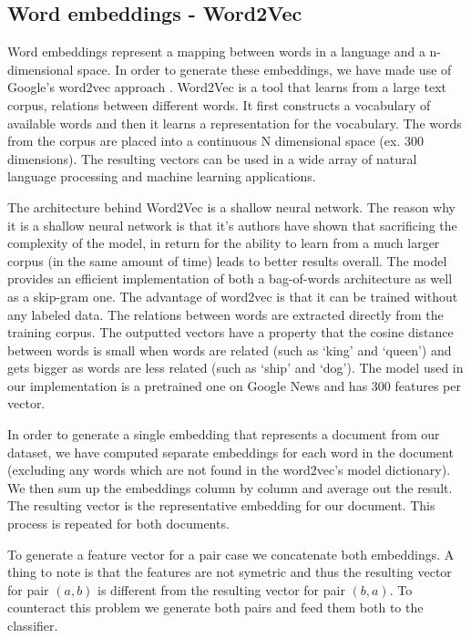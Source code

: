 \subsection{Word embeddings - Word2Vec}
\label{sub-sec:word-embeddings}
Word embeddings represent a mapping between words in a language and a n-dimensional
space. In order to generate these embeddings, we have made use of Google's word2vec
approach \cite{mikolov2013distributed}. Word2Vec is a tool that learns from a large
text corpus, relations between different words. It first constructs a vocabulary
of available words and then it learns a representation for the vocabulary.
The words from the corpus are placed into a continuous N dimensional space
(ex. 300 dimensions). The resulting vectors can be used in a wide array of
natural language processing and machine learning applications.

The architecture behind Word2Vec is a shallow neural network.
The reason why it is a shallow neural network is that it’s authors have
shown that sacrificing the complexity of the model, in return for the ability
to learn from a much larger corpus (in the same amount of time) leads to
better results overall. The model provides an efficient implementation of
both a bag-of-words architecture as well as a skip-gram one. The advantage of
word2vec is that it can be trained without any labeled data. The relations
between words are extracted directly from the training corpus. The outputted
vectors have a property that the cosine distance between words is small when
words are related (such as ‘king’ and ‘queen’) and gets bigger as words are
less related (such as ‘ship’ and ‘dog’). The model used in our implementation
is a pretrained one on Google News and has 300 features per vector.

In order to generate a single embedding that represents a document from our dataset,
we have computed separate embeddings for each word in the document (excluding any
words which are not found in the word2vec's model dictionary). We then sum up
the embeddings column by column and average out the result. The resulting vector
is the representative embedding for our document. This process is repeated for
both documents.

To generate a feature vector for a pair case we concatenate both embeddings. A
thing to note is that the features are not symetric and thus the resulting vector
for pair $ (a, b) $ is different from the resulting vector for pair $ (b, a) $.
To counteract this problem we generate both pairs and feed them both to the classifier.

